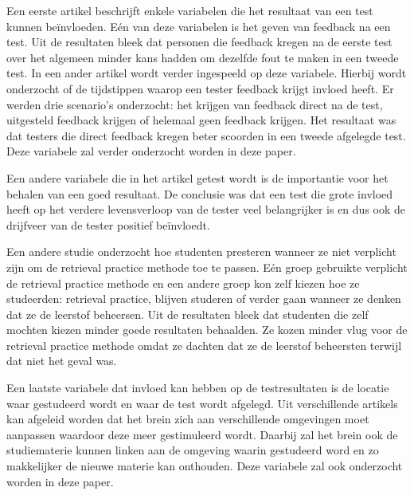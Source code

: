 \documentclass{hogent-article}
\begin{document}
    
    Een eerste artikel \autocite{brame2015test} beschrijft enkele variabelen die het resultaat van een test kunnen beïnvloeden. Eén van deze variabelen is het geven van feedback na een test. Uit de resultaten bleek dat personen die feedback kregen na de eerste test over het algemeen minder kans hadden om dezelfde fout te maken in een tweede test.
    In een ander artikel \autocite{roediger2011critical} wordt verder ingespeeld op deze variabele. Hierbij wordt onderzocht of de tijdstippen waarop een tester feedback krijgt invloed heeft. Er werden drie scenario's onderzocht: het krijgen van feedback direct na de test, uitgesteld feedback krijgen of helemaal geen feedback krijgen. Het resultaat was dat testers die direct feedback kregen beter scoorden in een tweede afgelegde test. Deze variabele zal verder onderzocht worden in deze paper.
    
    Een andere variabele die in het artikel \autocite{brame2015test} getest wordt is de importantie voor het behalen van een goed resultaat. De conclusie was dat een test die grote invloed heeft op het verdere levensverloop van de tester veel belangrijker is en dus ook de drijfveer van de tester positief beïnvloedt.
    
    Een andere studie \autocite{karpicke2009metacognitive} onderzocht hoe studenten presteren wanneer ze niet verplicht zijn om de retrieval practice methode toe te passen. Eén groep gebruikte verplicht de retrieval practice methode en een andere groep kon zelf kiezen hoe ze studeerden: retrieval practice, blijven studeren of verder gaan wanneer ze denken dat ze de leerstof beheersen. Uit de resultaten bleek dat studenten die zelf mochten kiezen minder goede resultaten behaalden. Ze kozen minder vlug voor de retrieval practice methode omdat ze dachten dat ze de leerstof beheersten terwijl dat niet het geval was. 
    
    
    Een laatste variabele dat invloed kan hebben op de testresultaten is de locatie waar gestudeerd wordt en waar de test wordt afgelegd. Uit verschillende artikels \autocite{smith1978environmental, smith1984contextual} kan afgeleid worden dat het brein zich aan verschillende omgevingen moet aanpassen waardoor deze meer gestimuleerd wordt. Daarbij zal het brein ook de studiematerie kunnen linken aan de omgeving waarin gestudeerd word en zo makkelijker de nieuwe materie kan onthouden. Deze variabele zal ook onderzocht worden in deze paper.
      
\end{document}
